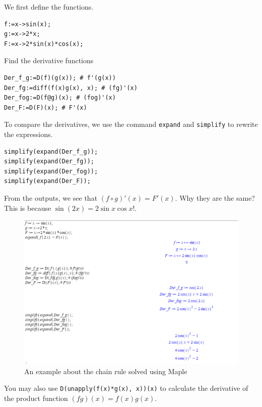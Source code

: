 \documentclass[]{book}
\theoremstyle{definition}
\theoremstyle{definition}
\theoremstyle{definition}
\theoremstyle{remark}
\let\BeginKnitrBlock\begin \let\EndKnitrBlock\end
\begin{document}
\BeginKnitrBlock{solution}
{}
We first define the functions.

\begin{verbatim}
f:=x->sin(x);
g:=x->2*x;
F:=x->2*sin(x)*cos(x);
\end{verbatim}

Find the derivative functions

\begin{verbatim}
Der_f_g:=D(f)(g(x)); # f'(g(x))
Der_fg:=diff(f(x)g(x), x); # (fg)'(x)
Der_fog:=D(f@g)(x); # (fog)'(x)
Der_F:=D(F)(x); # F'(x)
\end{verbatim}

To compare the derivatives, we use the command \texttt{expand} and \texttt{simplify} to rewrite the expressions.

\begin{verbatim}
simplify(expand(Der_f_g));
simplify(expand(Der_fg));
simplify(expand(Der_fog));
simplify(expand(Der_F));
\end{verbatim}

From the outputs, we see that \((f\circ g)'(x)=F'(x)\). Why they are the same? This is because \(\sin(2x)=2\sin x\cos x\)!.

\begin{figure}
\centering
\includegraphics{figs/chain_rule.png}
\caption{An example about the chain rule solved using Maple}
\end{figure}
\EndKnitrBlock{solution}

\BeginKnitrBlock{remark}
{}
You may also use \texttt{D(unapply(f(x)*g(x),\ x))(x)} to calculate the derivative of the product function \((fg)(x)=f(x)g(x)\).
\EndKnitrBlock{remark}
\end{document}
